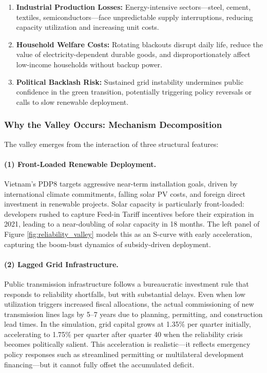 \documentclass[12pt, a4paper]{article}
\begin{document}
\begin{enumerate}
\item \textbf{Industrial Production Losses:} Energy-intensive sectors---steel, cement, textiles, semiconductors---face unpredictable supply interruptions, reducing capacity utilization and increasing unit costs.
\item \textbf{Household Welfare Costs:} Rotating blackouts disrupt daily life, reduce the value of electricity-dependent durable goods, and disproportionately affect low-income households without backup power.
\item \textbf{Political Backlash Risk:} Sustained grid instability undermines public confidence in the green transition, potentially triggering policy reversals or calls to slow renewable deployment.
\end{enumerate}

\subsubsection{Why the Valley Occurs: Mechanism Decomposition}

The valley emerges from the interaction of three structural features:

\paragraph{(1) Front-Loaded Renewable Deployment.} Vietnam's PDP8 targets aggressive near-term installation goals, driven by international climate commitments, falling solar PV costs, and foreign direct investment in renewable projects. Solar capacity is particularly front-loaded: developers rushed to capture Feed-in Tariff incentives before their expiration in 2021, leading to a near-doubling of solar capacity in 18 months. The left panel of Figure \ref{fig:reliability_valley} models this as an S-curve with early acceleration, capturing the boom-bust dynamics of subsidy-driven deployment.

\paragraph{(2) Lagged Grid Infrastructure.} Public transmission infrastructure follows a bureaucratic investment rule that responds to reliability shortfalls, but with substantial delays. Even when low utilization triggers increased fiscal allocations, the actual commissioning of new transmission lines lags by 5--7 years due to planning, permitting, and construction lead times. In the simulation, grid capital grows at 1.35\% per quarter initially, accelerating to 1.75\% per quarter after quarter 40 when the reliability crisis becomes politically salient. This acceleration is realistic---it reflects emergency policy responses such as streamlined permitting or multilateral development financing---but it cannot fully offset the accumulated deficit.
\end{document}
